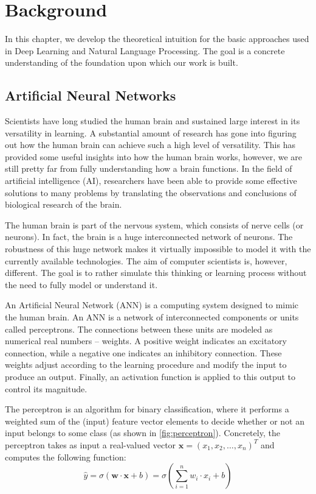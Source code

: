 \chapter{Background}
\label{ch:background}

\graphicspath{ {./body/media/} }


In this chapter, we develop the theoretical intuition for the basic approaches used in Deep Learning and Natural Language Processing. The goal is a concrete understanding of the foundation upon which our work is built.

\section{Artificial Neural Networks}
\label{sec:anns}

Scientists have long studied the human brain and sustained large interest in its versatility in learning. A substantial amount of research has gone into figuring out how the human brain can achieve such a high level of versatility. This has provided some useful insights into how the human brain works, however, we are still pretty far from fully understanding how a brain functions. In the field of artificial intelligence (AI), researchers have been able to provide some effective solutions to many problems by translating the observations and conclusions of biological research of the brain.

The human brain is part of the nervous system, which consists of nerve cells (or neurons). In fact, the brain is a huge interconnected network of neurons. The robustness of this huge network makes it virtually impossible to model it with the currently available technologies. The aim of computer scientists is, however, different. The goal is to rather simulate this thinking or learning process without the need to fully model or understand it.

An Artificial Neural Network (ANN) \citep{mcculloch1943logical} is a computing system designed to mimic the human brain. An ANN is a network of interconnected components or units called perceptrons. The connections between these units are modeled as numerical real numbers -- weights. A positive weight indicates an excitatory connection, while a negative one indicates an inhibitory connection. These weights adjust according to the learning procedure and modify the input to produce an output. Finally, an activation function is applied to this output to control its magnitude.

The perceptron \citep{rosenblatt1958perceptron} is an algorithm for binary classification, where it performs a weighted sum of the (input) feature vector elements to decide whether or not an input belongs to some class (as shown in \cref{fig:perceptron}). Concretely, the perceptron takes as input a real-valued vector $\mathbf{x} = (x_1, x_2, \ldots, x_n)^T$ and computes the following function:
\[ \hat y = \sigma (\mathbf{w} \cdot \mathbf{x} + b) = \sigma (\sum_{i = 1}^{n} w_i \cdot x_i + b) \]

